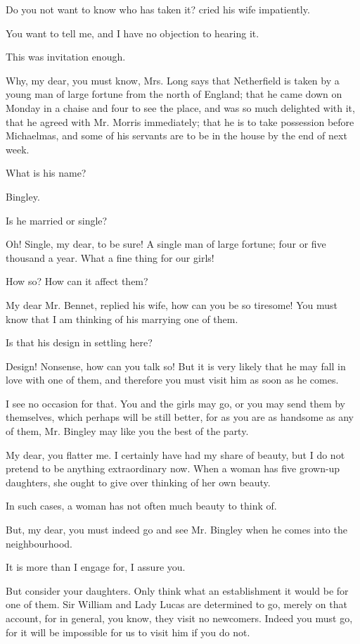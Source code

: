 \documentclass[DIV=6]{scrartcl}
\begin{document}
Do you not want to know who has taken it? cried his wife impatiently.

You want to tell me, and I have no objection to hearing it.

This was invitation enough.

Why, my dear, you must know, Mrs. Long says that Netherfield is taken
by a young man of large fortune from the north of England; that he came
down on Monday in a chaise and four to see the place, and was so much
delighted with it, that he agreed with Mr. Morris immediately; that he
is to take possession before Michaelmas, and some of his servants are to
be in the house by the end of next week.

What is his name?

Bingley.

Is he married or single?

Oh! Single, my dear, to be sure! A single man of large fortune; four or
five thousand a year. What a fine thing for our girls!

How so? How can it affect them?

My dear Mr. Bennet, replied his wife, how can you be so tiresome! You
must know that I am thinking of his marrying one of them.

Is that his design in settling here?

Design! Nonsense, how can you talk so! But it is very likely that he
may fall in love with one of them, and therefore you must visit him as
soon as he comes.

I see no occasion for that. You and the girls may go, or you may send
them by themselves, which perhaps will be still better, for as you are
as handsome as any of them, Mr. Bingley may like you the best of the
party.

My dear, you flatter me. I certainly have had my share of beauty, but
I do not pretend to be anything extraordinary now. When a woman has five
grown-up daughters, she ought to give over thinking of her own beauty.

In such cases, a woman has not often much beauty to think of.

But, my dear, you must indeed go and see Mr. Bingley when he comes into
the neighbourhood.

It is more than I engage for, I assure you.

But consider your daughters. Only think what an establishment it would
be for one of them. Sir William and Lady Lucas are determined to
go, merely on that account, for in general, you know, they visit no
newcomers. Indeed you must go, for it will be impossible for us to
visit him if you do not.
\end{document}
